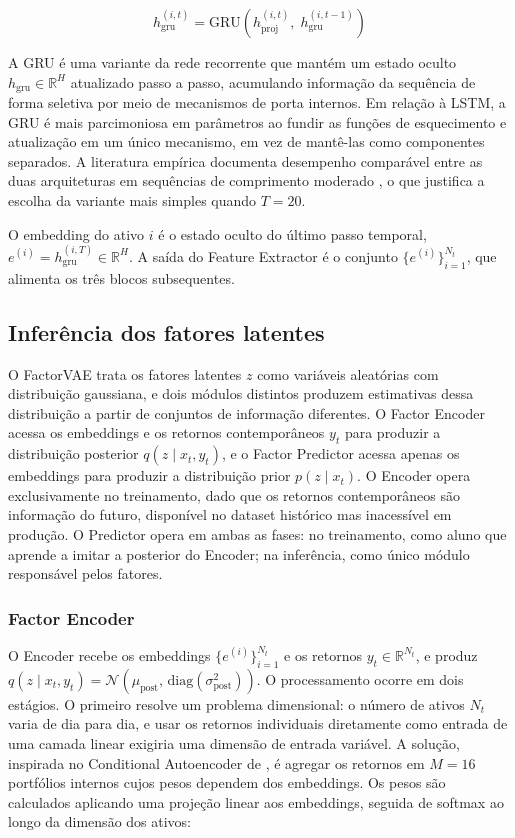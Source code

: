 \begin{equation}
    h_{\text{gru}}^{(i,t)} = \text{GRU}\!\left(h_{\text{proj}}^{(i,t)},\;
    h_{\text{gru}}^{(i,t-1)}\right)
    \label{eq:gru-feat}
\end{equation}

A GRU é uma variante da rede recorrente que mantém um estado oculto $h_{\text{gru}}
\in \mathbb{R}^H$ atualizado passo a passo, acumulando informação da sequência de
forma seletiva por meio de mecanismos de porta internos. Em relação à LSTM, a GRU é
mais parcimoniosa em parâmetros ao fundir as funções de esquecimento e atualização em
um único mecanismo, em vez de mantê-las como componentes separados. A literatura
empírica documenta desempenho comparável entre as duas arquiteturas em sequências de
comprimento moderado \parencite{chung2014}, o que justifica a escolha da variante mais
simples quando $T = 20$.

O embedding do ativo $i$ é o estado oculto do último passo temporal, $e^{(i)} =
h_{\text{gru}}^{(i,T)} \in \mathbb{R}^H$. A saída do Feature Extractor é o conjunto
$\{e^{(i)}\}_{i=1}^{N_t}$, que alimenta os três blocos subsequentes.


\subsection{Inferência dos fatores latentes}
\label{subsec:fatores-latentes}

O FactorVAE trata os fatores latentes $z$ como variáveis aleatórias com distribuição
gaussiana, e dois módulos distintos produzem estimativas dessa distribuição a partir de
conjuntos de informação diferentes. O Factor Encoder acessa os embeddings e os retornos
contemporâneos $y_t$ para produzir a distribuição posterior $q(z \mid x_t, y_t)$, e o
Factor Predictor acessa apenas os embeddings para produzir a distribuição prior $p(z
\mid x_t)$. O Encoder opera exclusivamente no treinamento, dado que os retornos
contemporâneos são informação do futuro, disponível no dataset histórico mas inacessível
em produção. O Predictor opera em ambas as fases: no treinamento, como aluno que
aprende a imitar a posterior do Encoder; na inferência, como único módulo responsável
pelos fatores.

\subsubsection{Factor Encoder}
O Encoder recebe os embeddings $\{e^{(i)}\}_{i=1}^{N_t}$ e os retornos $y_t \in
\mathbb{R}^{N_t}$, e produz $q(z \mid x_t, y_t) = \mathcal{N}(\mu_{\text{post}},\,
\mathrm{diag}(\sigma_{\text{post}}^2))$. O processamento ocorre em dois estágios. O
primeiro resolve um problema dimensional: o número de ativos $N_t$ varia de dia para
dia, e usar os retornos individuais diretamente como entrada de uma camada linear
exigiria uma dimensão de entrada variável. A solução, inspirada no Conditional
Autoencoder de \textcite{gu2021}, é agregar os retornos em $M = 16$ portfólios internos
cujos pesos dependem dos embeddings. Os pesos são calculados aplicando uma projeção
linear aos embeddings, seguida de softmax ao longo da dimensão dos ativos:

